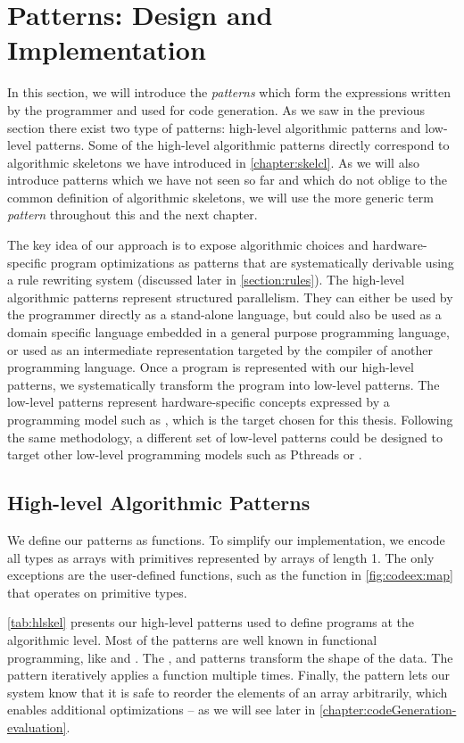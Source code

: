 \section{Patterns: Design and Implementation}
\label{section:patterns}

In this section, we will introduce the \emph{patterns} which form the expressions written by the programmer and used for code generation.
As we saw in the previous section there exist two type of patterns: high-level algorithmic patterns and low-level \OpenCL patterns.
Some of the high-level algorithmic patterns directly correspond to algorithmic skeletons we have introduced in \autoref{chapter:skelcl}.
As we will also introduce patterns which we have not seen so far and which do not oblige to the common definition of algorithmic skeletons, we will use the more generic term \emph{pattern} throughout this and the next chapter.

The key idea of our approach is to expose algorithmic choices and hardware-specific program optimizations as patterns that are systematically derivable using a rule rewriting system (discussed later in \autoref{section:rules}).
The high-level algorithmic patterns represent structured parallelism.
They can either be used by the programmer directly as a stand-alone language, but could also be used as a domain specific language embedded in a general purpose programming language, or used as an intermediate representation targeted by the compiler of another programming language.
Once a program is represented with our high-level patterns, we systematically transform the program into low-level patterns.
The low-level patterns represent hardware-specific concepts expressed by a programming model such as \OpenCL, which is the target chosen for this thesis.
Following the same methodology, a different set of low-level patterns could be designed to target other low-level programming models such as Pthreads or \MPI.


\subsection{High-level Algorithmic Patterns}

We define our patterns as functions.
To simplify our implementation, we encode all types as arrays with primitives represented by arrays of length 1.
The only exceptions are the user-defined functions, such as the  function in \autoref{fig:codeex:map} that operates on primitive types.

\autoref{tab:hlskel} presents our high-level patterns used to define programs at the algorithmic level.
Most of the patterns are well known in functional programming, like \map and \reduce.
The \zip, \splitN and \join patterns transform the shape of the data.
The \iterateN pattern iteratively applies a function multiple times.
Finally, the \reorder pattern lets our system know that it is safe to reorder the elements of an array arbitrarily, which enables additional optimizations -- as we will see later in \autoref{chapter:codeGeneration-evaluation}.

